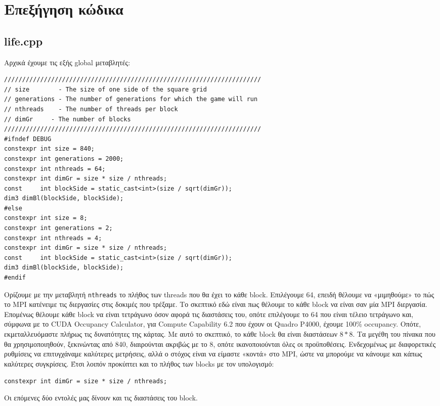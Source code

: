 \section{Επεξήγηση κώδικα}
\subsection{life.cpp}
Αρχικά έχουμε τις εξής global μεταβλητές:
\begin{tcolorbox}
\begin{verbatim}
///////////////////////////////////////////////////////////////////////
// size        - The size of one side of the square grid
// generations - The number of generations for which the game will run
// nthreads    - The number of threads per block
// dimGr     - The number of blocks
///////////////////////////////////////////////////////////////////////
#ifndef DEBUG
constexpr int size = 840;
constexpr int generations = 2000;
constexpr int nthreads = 64;
constexpr int dimGr = size * size / nthreads;
const     int blockSide = static_cast<int>(size / sqrt(dimGr));
dim3 dimBl(blockSide, blockSide);
#else
constexpr int size = 8;
constexpr int generations = 2;
constexpr int nthreads = 4;
constexpr int dimGr = size * size / nthreads;
const     int blockSide = static_cast<int>(size / sqrt(dimGr));
dim3 dimBl(blockSide, blockSide);
#endif
\end{verbatim}
\end{tcolorbox}

\begin{multicols}{2}
Ορίζουμε με την μεταβλητή \texttt{nthreads} το πλήθος των threads που θα έχει το κάθε block. Επιλέγουμε 64, επειδή θέλουμε να «μιμηθούμε» το πώς το MPI κατένειμε τις διεργασίες στις δοκιμές που τρέξαμε. Το σκεπτικό εδώ είναι πως θέλουμε το κάθε block να είναι σαν μία MPI διεργασία. Επομένως θέλουμε κάθε block να είναι τετράγωνο όσον αφορά τις διαστάσεις του, οπότε επιλέγουμε το 64 που είναι τέλειο τετράγωνο και, σύμφωνα με το CUDA Occupancy Calculator, για Compute Capability 6.2 που έχουν οι Quadro P4000, έχουμε 100\% occupancy. Οπότε, εκμεταλλευόμαστε πλήρως τις δυνατότητες της κάρτας. Με αυτό το σκεπτικό, το κάθε block θα είναι διαστάσεων $8 * 8$. Τα μεγέθη του πίνακα που θα χρησιμοποιηθούν, ξεκινώντας από 840, διαιρούνται ακριβώς με το 8, οπότε ικανοποιούνται όλες οι προϋποθέσεις. Ενδεχομένως με διαφορετικές ρυθμίσεις να επιτυγχάναμε καλύτερες μετρήσεις, αλλά ο στόχος είναι να είμαστε «κοντά» στο MPI, ώστε να μπορούμε να κάνουμε και κάπως καλύτερες συγκρίσεις. Έτσι λοιπόν προκύπτει και το πλήθος των blocks με τον υπολογισμό:

\begin{tcolorbox}
\texttt{constexpr int dimGr = size * size / nthreads;}
\end{tcolorbox}
Οι επόμενες δύο εντολές μας δίνουν και τις διαστάσεις του block.
\end{multicols}

